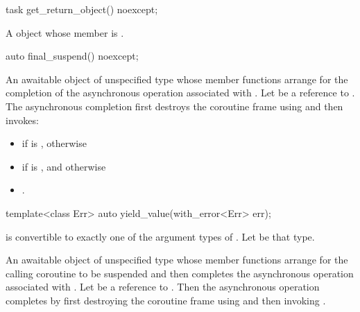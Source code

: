 %
\begin{itemdecl}
task get_return_object() noexcept;
\end{itemdecl}
\begin{itemdescr}
\pnum
\returns
A  object whose member  is
.
\end{itemdescr}

%
\begin{itemdecl}
auto final_suspend() noexcept;
\end{itemdecl}
\begin{itemdescr}
\pnum
\returns
An awaitable object of unspecified type whose
member functions arrange for the completion of the asynchronous
operation associated with .
Let  be a reference to .
The asynchronous completion first destroys the coroutine frame
using  and then invokes:
\begin{itemize}
\item
{}
if  is , otherwise
\item
{} if  is ,
and otherwise
\item
 .
\end{itemize}
\end{itemdescr}

%
\begin{itemdecl}
template<class Err>
  auto yield_value(with_error<Err> err);
\end{itemdecl}
\begin{itemdescr}
\pnum
\mandates
{} is convertible to exactly one of the
 argument types of .
Let  be that type.

\pnum
\returns
An awaitable object of unspecified type whose
member functions arrange for the calling coroutine to be suspended
and then completes the asynchronous operation associated with
.
Let  be a reference to .
Then the asynchronous operation completes by first
destroying the coroutine frame using 
and then invoking
.
\end{itemdescr}

